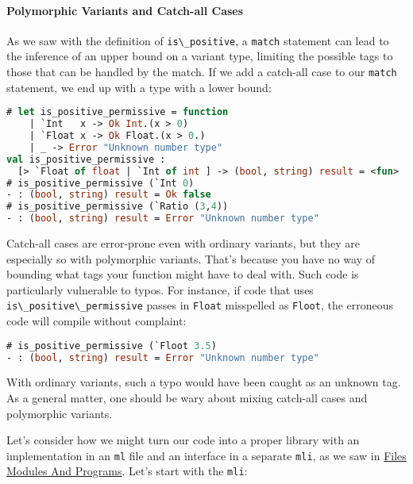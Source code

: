 \hypertarget{polymorphic-variants-and-catch-all-cases}{%
\paragraph{Polymorphic Variants and Catch-all
Cases}\label{polymorphic-variants-and-catch-all-cases}}

As we saw with the definition of \passthrough{\lstinline!is\_positive!},
a \passthrough{\lstinline!match!} statement can lead to the inference of
an upper bound on a variant type, limiting the possible tags to those
that can be handled by the match. If we add a catch-all case to our
\passthrough{\lstinline!match!} statement, we end up with a type with a
lower bound:

\begin{lstlisting}[language=Caml]
# let is_positive_permissive = function
    | `Int   x -> Ok Int.(x > 0)
    | `Float x -> Ok Float.(x > 0.)
    | _ -> Error "Unknown number type"
val is_positive_permissive :
  [> `Float of float | `Int of int ] -> (bool, string) result = <fun>
# is_positive_permissive (`Int 0)
- : (bool, string) result = Ok false
# is_positive_permissive (`Ratio (3,4))
- : (bool, string) result = Error "Unknown number type"
\end{lstlisting}

Catch-all cases are error-prone even with ordinary variants, but they
are especially so with polymorphic variants. That's because you have no
way of bounding what tags your function might have to deal with. Such
code is particularly vulnerable to typos. For instance, if code that
uses \passthrough{\lstinline!is\_positive\_permissive!} passes in
\passthrough{\lstinline!Float!} misspelled as
\passthrough{\lstinline!Floot!}, the erroneous code will compile without
complaint:

\begin{lstlisting}[language=Caml]
# is_positive_permissive (`Floot 3.5)
- : (bool, string) result = Error "Unknown number type"
\end{lstlisting}

With ordinary variants, such a typo would have been caught as an unknown
tag. As a general matter, one should be wary about mixing catch-all
cases and polymorphic variants.

Let's consider how we might turn our code into a proper library with an
implementation in an \passthrough{\lstinline!ml!} file and an interface
in a separate \passthrough{\lstinline!mli!}, as we saw in
\href{files-modules-and-programs.html\#files-modules-and-programs}{Files
Modules And Programs}. Let's start with the
\passthrough{\lstinline!mli!}:

